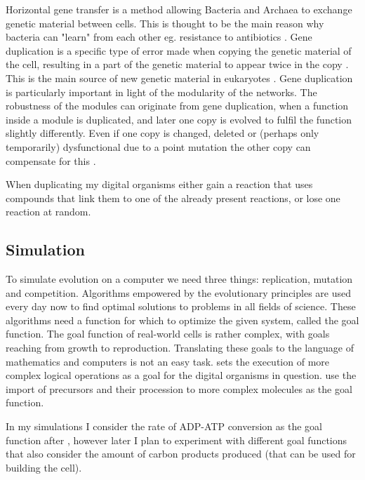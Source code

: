 \documentclass[10pt,a4paper]{article}
\begin{document}
	Horizontal gene transfer is a method allowing Bacteria and Archaea to exchange genetic material between cells. This is thought to be the main reason why bacteria can "learn" from each other eg. resistance to antibiotics \cite{horizontalAntibiotics}\cite{horizontalgenetransfer}. Gene duplication is a specific type of error made when copying the genetic material of the cell, resulting in a part of the genetic material to appear twice in the copy \cite{geneduplication}. This is the main source of new genetic material in eukaryotes \cite{horizontalgenetransfer}. Gene duplication is particularly important in light of the modularity of the networks. The robustness of the modules can originate from gene duplication, when a function inside a module is duplicated, and later one copy is evolved to fulfil the function slightly differently. Even if one copy is changed, deleted or (perhaps only temporarily) dysfunctional due to a point mutation the other copy can compensate for this \cite{duplicaterole} \cite{complexfeatures}. 
	
	When duplicating my digital organisms either gain a reaction that uses compounds that link them to one of the already present reactions, or lose one reaction at random. 
	
	\subsection{Simulation}
	
	To simulate evolution on a computer we need three things: replication, mutation and competition. Algorithms empowered by the evolutionary principles \cite{evolutionaryalgorithms} are used every day now to find optimal solutions to problems in all fields of science. These algorithms need a function for which to optimize the given system, called the goal function. The goal function of real-world cells is rather complex, with goals reaching from growth to reproduction. Translating these goals to the language of mathematics and computers is not an easy task. \citeauthor{complexfeatures} sets the execution of more complex logical operations as a goal for the digital organisms in question. \citeauthor{evolutioncomplex} use the import of precursors and their procession to more complex molecules as the goal function. 
	
	In my simulations I consider the rate of ADP-ATP conversion as the goal function after \citeauthor{BartekLower}, however later I plan to experiment with different goal functions that also consider the amount of carbon products produced (that can be used for building the cell). 
	
\end{document}
